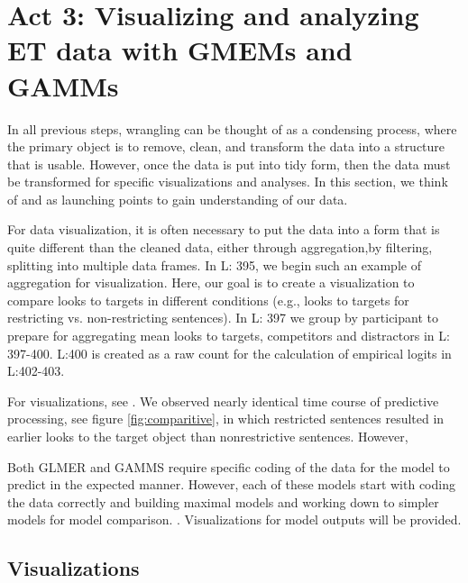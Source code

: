 \section{Act 3: Visualizing and analyzing ET data with GMEMs and GAMMs}

In all previous steps, wrangling can be thought of as a condensing process, where the primary object is to remove, clean, and transform the data into a structure that is usable. However, once the data is put into tidy form, then the data must be transformed for specific  visualizations and analyses. In this section, we think of  and  as launching points to gain understanding of our data. 

For data visualization, it is often necessary to put the data into a form that is quite different than the cleaned data, either through aggregation,by filtering, splitting into multiple data frames. In L: 395, we begin such an example of aggregation for visualization. Here, our goal is to create a visualization to compare looks to targets in different conditions (e.g., looks to targets for  restricting vs.  non-restricting sentences). In L: 397 we group by participant to prepare for aggregating mean looks to targets, competitors and distractors in L: 397-400. L:400 is created as a raw count for the calculation of empirical logits in L:402-403.



For  visualizations, see . We observed nearly identical time course of predictive processing, see figure \ref{fig:comparitive}, in which restricted sentences resulted in earlier looks to the target object than nonrestrictive sentences. However, 



Both GLMER and GAMMS require specific coding of the data for the model to predict in the expected manner. However, each of these models start with coding the data correctly and building maximal models and working down to simpler models for model comparison. \parencite{max model}. Visualizations for model outputs will be provided.

\subsection{Visualizations}



